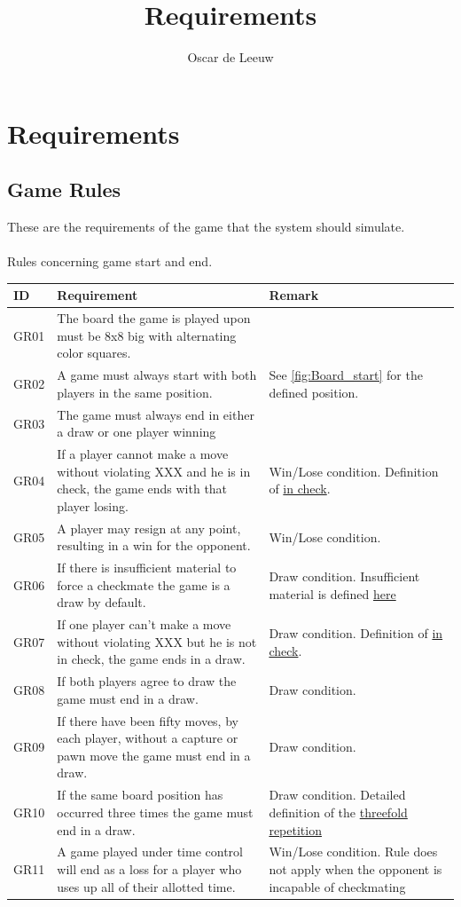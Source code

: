 \documentclass{report}
\title{Requirements}
\author{Oscar de Leeuw}
\begin{document}
\maketitle
\tableofcontents
\newpage

\chapter{Requirements}
\newpage
\section{Game Rules}
These are the requirements of the game that the system should simulate.
\\ \\
Rules concerning game start and end.
\begin{center}
    \begin{tabular}{ | l | p{5.8cm} | p{4cm} |}
    \hline
    ID & Requirement & Remark \\ \hline
    GR01 & The board the game is played upon must be 8x8 big with 
    alternating color squares. &  \\ \hline
    GR02 & A game must always start with both players in the same position. 
    & See \hyperref[fig:Board_start]{\ref*{fig:Board_start}} for the defined
    position.\\ \hline
    GR03 & The game must always end in either a draw or 
    one player winning & \\ \hline
    GR04 & If a player cannot make a move without violating XXX and he is in 
    check, the game ends with that player losing. & 
    Win/Lose condition. Definition of 
    \hyperref[def:In_check]{in check}. \\ \hline
    GR05 & A player may resign at any point, 
    resulting in a win for the opponent. & Win/Lose condition.\\ \hline
    GR06 & If there is insufficient material to force a checkmate the game is
    a draw by default.
    & Draw condition. Insufficient material is defined
    \hyperref[def:Insufficient_material]{here}  \\ \hline
    GR07 & If one player can't make a move without violating XXX but he is not
    in check, the game ends in a draw.
    & Draw condition. Definition of 
    \hyperref[def:In_check]{in check}.  \\ \hline
    GR08 & If both players agree to draw the game must end in a draw.
    & Draw condition. \\ \hline
    GR09 & If there have been fifty moves, by each player, without a capture 
    or pawn move the game must end in a draw. & Draw condition. \\ \hline
    GR10 & If the same board position has occurred three times 
    the game must end in a draw. & Draw condition. Detailed definition of the 
    \hyperref[def:Threefold_repetition]{threefold repetition} \\ \hline
	GR11 & A game played under time control will end as a loss for a player who 				uses up all of their allotted time.
    & Win/Lose condition. Rule does not apply when the opponent is incapable of 				checkmating  \\ \hline



\end{tabular}
\end{center}
\end{document}
